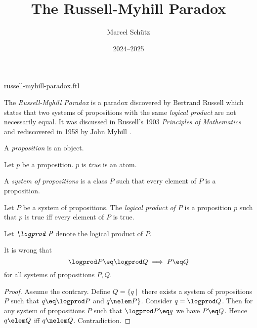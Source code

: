 \documentclass{article}
\title{The Russell-Myhill Paradox}
\author{Marcel Schütz}
\date{2024--2025}
\begin{document}
\begin{smodule}{russell-myhill-paradox.ftl}
\maketitle



\noindent The \emph{Russell-Myhill Paradox} is a paradox discovered by 
Bertrand Russell which states that two systems of propositions with the same 
\emph{logical product} are not necessarily equal.
It was discussed in Russell's 1903 \emph{Principles of Mathematics}
\cite[Appendix B]{Russell1903} and rediscovered in 1958 by John Myhill
\cite{Myhill1958}.

\begin{forthel}
  \begin{signature*}
    A \emph{proposition} is an object.
  \end{signature*}

  \begin{signature*}
    Let $p$ be a proposition.
    $p$ is \emph{true} is an atom.
  \end{signature*}

  \begin{definition*}
    A \emph{system of propositions} is a class $P$ such that every element of $P$ is a proposition.
  \end{definition*}

  \begin{signature*}[for=logprod]
    Let $P$ be a system of propositions.
    The \emph{logical product of $P$} is a proposition $p$ such that $p$ is true iff every element of $P$ is true.
  
  Let $\emph{\logprod P}$ denote the logical product of $P$.
  \end{signature*}
  
  \begin{theorem*}[title=Russell-Myhill Paradox,id=russell_myhill_paradox]
    It is wrong that
    \[ \logprod P \eq \logprod Q \implies P \eq Q \]
    for all systems of propositions $P, Q$.
  \end{theorem*}
  \begin{proof}
    Assume the contrary.
    Define $Q = \{q \mid$ there exists a system of propositions $P$ such that $q \eq \logprod P$ and $q \nelem P\}$.
    Consider $q = \logprod Q$.
    Then for any system of propositions $P$ such that $\logprod P \eq q$ we have $P \eq Q$.
    Hence $q \elem Q$ iff $q \nelem Q$.
    Contradiction.
  \end{proof}
\end{forthel}

\printbibliography
{}
\end{smodule}
\end{document}
